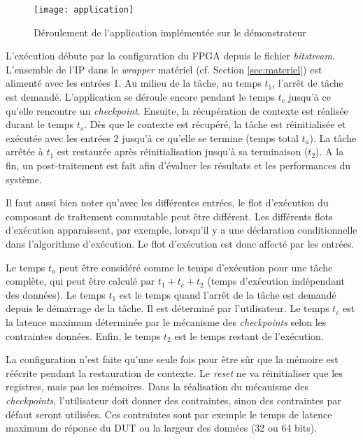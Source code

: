 \begin{figure}[h]
	\centering
	\texttt{[image: application]}
	\caption{Déroulement de l'application implémentée sur le démonstrateur}
	\label{fig:application}
	\vspace{-2mm}
\end{figure}

L'exécution débute par la configuration du FPGA depuis le fichier \emph{bitstream}. L'ensemble de l'IP
dans le \emph{wrapper} matériel (cf. Section \ref{sec:materiel}) est alimenté avec les entrées 1.
Au milieu de la tâche, au temps $t_1$, l'arrêt de tâche est demandé. L'application se déroule encore
pendant le temps $t_c$ jusqu'à ce qu'elle rencontre
un \emph{checkpoint}. Ensuite, la récupération de contexte est réalisée durant le temps
$t_s$. Dès que le contexte est récupéré, la tâche est réinitialisée et exécutée avec 
les entrées 2 jusqu'à ce qu'elle se termine (temps total $t_a$).
La tâche arrêtée à $t_1$ est restaurée après réinitialisation jusqu'à sa terminaison ($t_2$). 
A la fin, un post-traitement est fait afin d'évaluer les résultats et les performances du système.

Il faut aussi bien noter qu'avec les différentes entrées, le flot d'exécution du composant de traitement
commutable peut être différent. Les différents flots d'exécution apparaissent, par exemple, lorsqu'il y a 
une déclaration conditionnelle dans l'algorithme d'exécution. Le flot d'exécution est donc affecté par les entrées.

Le temps $t_a$ peut être considéré comme le temps d'exécution pour une tâche complète,
qui peut être calculé par $t_1 + t_c + t_2$ (temps d'exécution indépendant des données). 
Le temps $t_1$ est le temps quand l'arrêt de la tâche est demandé
depuis le démarrage de la tâche. Il est déterminé par l'utilisateur. 
Le temps $t_c$ est la latence maximum déterminée
par le mécanisme des \emph{checkpoints} selon les contraintes données. Enfin, le temps $t_2$ est
le temps restant de l'exécution.

La configuration n'est faite qu'une seule fois pour être sûr que la mémoire est réécrite pendant la restauration
de contexte. Le \emph{reset} ne va réinitialiser que les registres, mais pas les mémoires.
Dans la réalisation du mécanisme des \emph{checkpoints}, l'utilisateur doit donner des contraintes,
sinon des contraintes par défaut seront utilisées. Ces contraintes sont par exemple le temps de latence maximum de réponse du DUT ou
la largeur des données (32 ou 64 bits).

